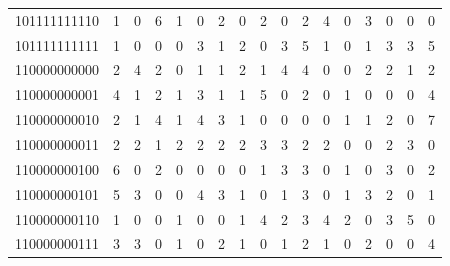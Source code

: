 \documentclass[10pt,a4paper]{article}
\begin{document}
\begin{longtable}{ |c|c|c|c|c|c|c|c|c|c|c|c|c|c|c|c|c| }
    101111111110              & 1                            & 0                                & 6                            & 1                              & 0   & 2   & 0   & 2   & 0   & 2   & 4   & 0   & 3   & 0   & 0   & 0   \\
    101111111111              & 1                            & 0                                & 0                            & 0                              & 3   & 1   & 2   & 0   & 3   & 5   & 1   & 0   & 1   & 3   & 3   & 5   \\
    110000000000              & 2                            & 4                                & 2                            & 0                              & 1   & 1   & 2   & 1   & 4   & 4   & 0   & 0   & 2   & 2   & 1   & 2   \\
    110000000001              & 4                            & 1                                & 2                            & 1                              & 3   & 1   & 1   & 5   & 0   & 2   & 0   & 1   & 0   & 0   & 0   & 4   \\
    110000000010              & 2                            & 1                                & 4                            & 1                              & 4   & 3   & 1   & 0   & 0   & 0   & 0   & 1   & 1   & 2   & 0   & 7   \\
    110000000011              & 2                            & 2                                & 1                            & 2                              & 2   & 2   & 2   & 3   & 3   & 2   & 2   & 0   & 0   & 2   & 3   & 0   \\
    110000000100              & 6                            & 0                                & 2                            & 0                              & 0   & 0   & 0   & 1   & 3   & 3   & 0   & 1   & 0   & 3   & 0   & 2   \\
    110000000101              & 5                            & 3                                & 0                            & 0                              & 4   & 3   & 1   & 0   & 1   & 3   & 0   & 1   & 3   & 2   & 0   & 1   \\
    110000000110              & 1                            & 0                                & 0                            & 1                              & 0   & 0   & 1   & 4   & 2   & 3   & 4   & 2   & 0   & 3   & 5   & 0   \\
    110000000111              & 3                            & 3                                & 0                            & 1                              & 0   & 2   & 1   & 0   & 1   & 2   & 1   & 0   & 2   & 0   & 0   & 4   \\

\end{longtable}
\end{document}
